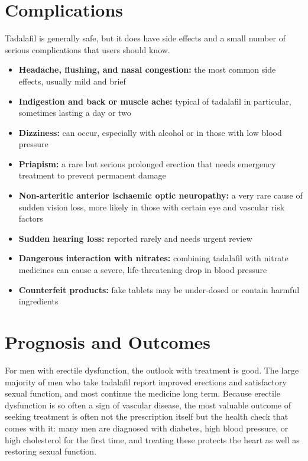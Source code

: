 \section*{Complications}
Tadalafil is generally safe, but it does have side effects and a small number of serious complications that users should know.

\begin{itemize}
    \item \textbf{Headache, flushing, and nasal congestion:} the most common side effects, usually mild and brief
    \item \textbf{Indigestion and back or muscle ache:} typical of tadalafil in particular, sometimes lasting a day or two
    \item \textbf{Dizziness:} can occur, especially with alcohol or in those with low blood pressure
    \item \textbf{Priapism:} a rare but serious prolonged erection that needs emergency treatment to prevent permanent damage
    \item \textbf{Non-arteritic anterior ischaemic optic neuropathy:} a very rare cause of sudden vision loss, more likely in those with certain eye and vascular risk factors
    \item \textbf{Sudden hearing loss:} reported rarely and needs urgent review
    \item \textbf{Dangerous interaction with nitrates:} combining tadalafil with nitrate medicines can cause a severe, life-threatening drop in blood pressure
    \item \textbf{Counterfeit products:} fake tablets may be under-dosed or contain harmful ingredients
\end{itemize}

\section*{Prognosis and Outcomes}
For men with erectile dysfunction, the outlook with treatment is good. The large majority of men who take tadalafil report improved erections and satisfactory sexual function, and most continue the medicine long term. Because erectile dysfunction is so often a sign of vascular disease, the most valuable outcome of seeking treatment is often not the prescription itself but the health check that comes with it: many men are diagnosed with diabetes, high blood pressure, or high cholesterol for the first time, and treating these protects the heart as well as restoring sexual function.

